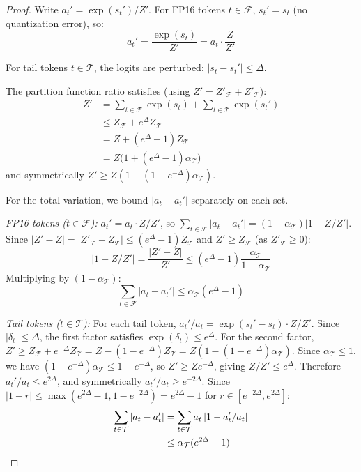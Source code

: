 \documentclass[10pt,twocolumn,a4paper]{article}
\theoremstyle{definition}
\theoremstyle{remark}
\begin{document}
\begin{proof}
Write $a_t' = \exp(s_t')/Z'$.  For FP16 tokens $t \in \mathcal{F}$, $s_t' = s_t$ (no quantization error), so:
\[
  a_t' = \frac{\exp(s_t)}{Z'} = a_t \cdot \frac{Z}{Z'}
\]

For tail tokens $t \in \mathcal{T}$, the logits are perturbed: $|s_t - s_t'| \leq \Delta$.

The partition function ratio satisfies (using $Z' = Z'_{\mathcal{F}} + Z'_{\mathcal{T}}$):
\begin{align*}
  Z' &= \sum_{t \in \mathcal{F}} \exp(s_t) + \sum_{t \in \mathcal{T}} \exp(s_t') \\
     &\leq Z_{\mathcal{F}} + e^{\Delta} Z_{\mathcal{T}} \\
     &= Z + (e^{\Delta} - 1) Z_{\mathcal{T}} \\
     &= Z\bigl(1 + (e^{\Delta} - 1)\alpha_{\mathcal{T}}\bigr)
\end{align*}
and symmetrically $Z' \geq Z(1 - (1 - e^{-\Delta})\alpha_{\mathcal{T}})$.

For the total variation, we bound $|a_t - a_t'|$ separately on each set.

\emph{FP16 tokens ($t \in \mathcal{F}$):}  $a_t' = a_t \cdot Z/Z'$, so
$\sum_{t \in \mathcal{F}} |a_t - a_t'| = (1 - \alpha_{\mathcal{T}}) |1 - Z/Z'|$.
Since $|Z' - Z| = |Z'_{\mathcal{T}} - Z_{\mathcal{T}}| \leq (e^{\Delta} - 1)Z_{\mathcal{T}}$
and $Z' \geq Z_{\mathcal{F}}$ (as $Z'_{\mathcal{T}} \geq 0$):
\[
  |1 - Z/Z'| = \frac{|Z' - Z|}{Z'}
  \leq (e^{\Delta} - 1)\frac{\alpha_{\mathcal{T}}}{1 - \alpha_{\mathcal{T}}}
\]
Multiplying by $(1 - \alpha_{\mathcal{T}})$:
\begin{equation}\label{eq:fp16_contrib}
  \sum_{t \in \mathcal{F}} |a_t - a_t'| \leq \alpha_{\mathcal{T}} (e^{\Delta} - 1)
\end{equation}

\emph{Tail tokens ($t \in \mathcal{T}$):}  For each tail token, $a_t'/a_t = \exp(s_t' - s_t) \cdot Z/Z'$.
Since $|\delta_t| \leq \Delta$, the first factor satisfies $\exp(\delta_t) \leq e^{\Delta}$.
For the second factor, $Z' \geq Z_{\mathcal{F}} + e^{-\Delta}Z_{\mathcal{T}} = Z - (1 - e^{-\Delta})Z_{\mathcal{T}} = Z(1 - (1 - e^{-\Delta})\alpha_{\mathcal{T}})$.
Since $\alpha_{\mathcal{T}} \leq 1$, we have $(1 - e^{-\Delta})\alpha_{\mathcal{T}} \leq 1 - e^{-\Delta}$, so $Z' \geq Z e^{-\Delta}$, giving $Z/Z' \leq e^{\Delta}$.
Therefore $a_t'/a_t \leq e^{2\Delta}$, and symmetrically $a_t'/a_t \geq e^{-2\Delta}$.
Since $|1 - r| \leq \max(e^{2\Delta} - 1, 1 - e^{-2\Delta}) = e^{2\Delta} - 1$ for $r \in [e^{-2\Delta}, e^{2\Delta}]$:
\begin{align}\label{eq:tail_contrib}
  \sum_{t \in \mathcal{T}} |a_t - a_t'|
  &= \sum_{t \in \mathcal{T}} a_t \,|1 - a_t'/a_t| \notag \\
  &\leq \alpha_{\mathcal{T}} (e^{2\Delta} - 1)
\end{align}


\end{proof}
\end{document}
